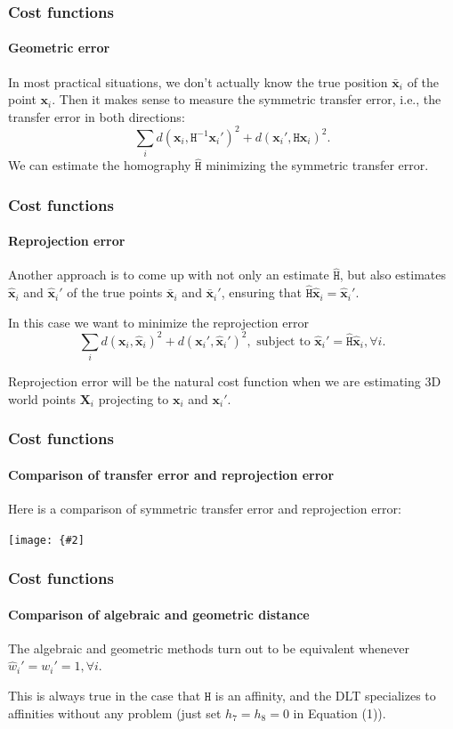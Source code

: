\documentclass[aspectratio=169]{beamer}
\renewcommand{\vec}[1]{\boldsymbol{#1}}
\newcommand{\mat}[1]{\mathtt{#1}}
\newcommand{\myfig}[3]{\centerline{\texttt{[image: \{\#2]}}}
\begin{document}
\begin{frame}
\frametitle{Cost functions}
\framesubtitle{Geometric error}

In most practical situations, we don't actually know the true position
$\bar{\vec{x}}_i$ of the point $\vec{x}_i$.  Then it makes sense to
measure the \alert{symmetric transfer error}, i.e., the transfer error
in \alert{both directions}:
\begin{equation*}
\sum_i d(\vec{x}_i,\mat{H}^{-1}\vec{x}_i')^2 +
d(\vec{x}_i',\mat{H}\vec{x}_i)^2.
\end{equation*}
We can estimate the homography $\hat{\mat{H}}$ minimizing the symmetric
transfer error.

\end{frame}

\begin{frame}
\frametitle{Cost functions}
\framesubtitle{Reprojection error}

Another approach is to come up with not only an estimate
$\hat{\mat{H}}$, but also \alert{estimates} $\hat{\vec{x}}_i$ and
$\hat{\vec{x}}_i'$ of the \alert{true points} $\bar{\vec{x}}_i$ and
$\bar{\vec{x}}_i'$, ensuring that
$\hat{\mat{H}}\hat{\vec{x}}_i=\hat{\vec{x}}_i'$.

\medskip

In this case we want to minimize the \alert{reprojection error}
\begin{equation*}
\sum_i d(\vec{x}_i,\hat{\vec{x}}_i)^2 +
d(\vec{x}_i',\hat{\vec{x}}_i')^2, \text{\ subject\ to\ }
\hat{\vec{x}}_i' = \hat{\mat{H}}\hat{\vec{x}}_i, \forall i.
\end{equation*}

\medskip

Reprojection error will be the natural cost function when we are estimating
3D world points $\vec{X}_i$ projecting to $\vec{x}_i$ and
$\vec{x}_i'$.

\end{frame}

\begin{frame}
\frametitle{Cost functions}
\framesubtitle{Comparison of transfer error and reprojection error}

Here is a comparison of symmetric transfer error and reprojection
error:

\medskip

\myfig{4in}{HZ-fig3-2}{Hartley and Zisserman (2004), Fig.\ 4.2}

\end{frame}

\begin{frame}
\frametitle{Cost functions}
\framesubtitle{Comparison of algebraic and geometric distance}

The algebraic and geometric methods turn out to be \alert{equivalent}
whenever $\hat{w}_i' = w_i' = 1, \forall i$.

\medskip

This is always true in the case that $\mat{H}$ is an affinity, and the
DLT specializes to affinities without any problem (just set
$h_7=h_8=0$ in Equation (1)).

\end{frame}
\end{document}
